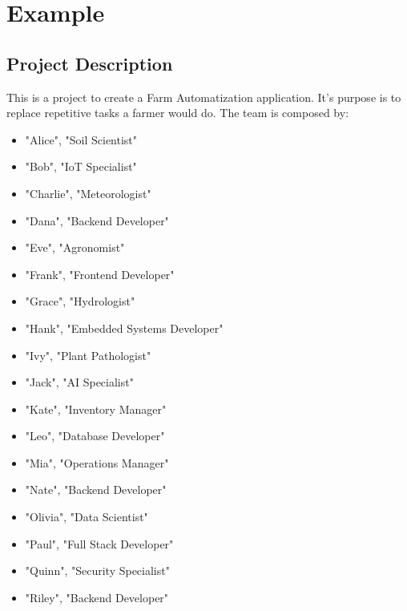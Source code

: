 \section{Example}
\label{sec:bnf}
\subsection {Project Description}
This is a project to create a Farm Automatization application. It's purpose is to replace repetitive tasks a farmer would do.
The team is composed by:
\begin{itemize}
	\item "Alice", "Soil Scientist"
	\item "Bob", "IoT Specialist"
	\item "Charlie", "Meteorologist"
	\item "Dana", "Backend Developer"
	\item "Eve", "Agronomist"
	\item "Frank", "Frontend Developer"
	\item "Grace", "Hydrologist"
	\item "Hank", "Embedded Systems Developer"
	\item "Ivy", "Plant Pathologist"
	\item "Jack", "AI Specialist"
	\item "Kate", "Inventory Manager"
	\item "Leo", "Database Developer"
	\item "Mia", "Operations Manager"
	\item "Nate", "Backend Developer"
	\item "Olivia", "Data Scientist"
	\item "Paul", "Full Stack Developer"
	\item "Quinn", "Security Specialist"
	\item "Riley", "Backend Developer"
\end{itemize}

